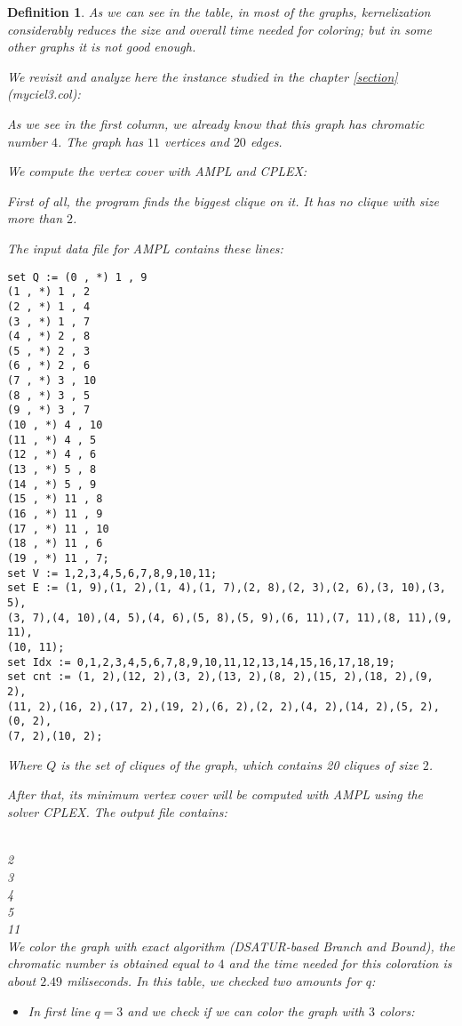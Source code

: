 \documentclass[12pt]{article}
\theoremstyle{slplain}
\newtheorem{defi}{Definition}
\begin{document}
\begin{defi}
As we can see in the table, in most of the graphs, kernelization considerably reduces the size and overall time needed for coloring; but in some other graphs it is not good enough.

We revisit and analyze here the instance studied in the chapter \ref{section} (myciel3.col):
     
As we see in the first column, we already know that this graph has chromatic number $4$. The graph has $11$ vertices and $20$ edges. 

We compute the vertex cover with AMPL and CPLEX: 

First of all, the program finds the biggest clique on it. It has no clique with size more than $2$.

The input data file for AMPL contains these lines:
\newpage
{\small 
\begin{verbatim}
set Q := (0 , *) 1 , 9
(1 , *) 1 , 2
(2 , *) 1 , 4
(3 , *) 1 , 7
(4 , *) 2 , 8
(5 , *) 2 , 3
(6 , *) 2 , 6
(7 , *) 3 , 10
(8 , *) 3 , 5
(9 , *) 3 , 7
(10 , *) 4 , 10
(11 , *) 4 , 5
(12 , *) 4 , 6
(13 , *) 5 , 8
(14 , *) 5 , 9
(15 , *) 11 , 8
(16 , *) 11 , 9
(17 , *) 11 , 10
(18 , *) 11 , 6
(19 , *) 11 , 7;
set V := 1,2,3,4,5,6,7,8,9,10,11;
set E := (1, 9),(1, 2),(1, 4),(1, 7),(2, 8),(2, 3),(2, 6),(3, 10),(3, 5),
(3, 7),(4, 10),(4, 5),(4, 6),(5, 8),(5, 9),(6, 11),(7, 11),(8, 11),(9, 11),
(10, 11);
set Idx := 0,1,2,3,4,5,6,7,8,9,10,11,12,13,14,15,16,17,18,19;
set cnt := (1, 2),(12, 2),(3, 2),(13, 2),(8, 2),(15, 2),(18, 2),(9, 2),
(11, 2),(16, 2),(17, 2),(19, 2),(6, 2),(2, 2),(4, 2),(14, 2),(5, 2),(0, 2),
(7, 2),(10, 2);
\end{verbatim}
}
Where $Q$ is the set of cliques of the graph, which contains 20 cliques of size $2$.

After that, its minimum vertex cover will be computed with AMPL using the solver CPLEX. The output file contains:

 \\
2 \\
3 \\
4 \\
5 \\
11 \\


We color the graph with exact algorithm (DSATUR-based Branch and Bound), the chromatic number is obtained equal to $4$ and the time needed for this coloration is about $2.49$ miliseconds.  In this table, we checked two amounts for $q$: 

\begin{itemize}
\item In first line $q = 3$ and we check if we can color the graph with $3$ colors:


\end{itemize}
\end{defi}
\end{document}
